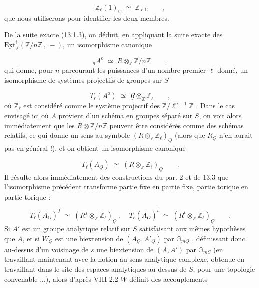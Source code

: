 \begin{equation*}
\mathbb{Z}_{\ell}(1)_{\mathbb{C}} \;\simeq\; \mathbb{Z}_{\ell\mathbb{C}} \qquad ,
\end{equation*}
que nous utiliserons pour identifier les deux membres.

De la suite exacte (13.1.3), on déduit, en appliquant la suite exacte des $\underline{\mathrm{Ext}}^{i}_{\mathbb{Z}}(\mathbb{Z}/n\mathbb{Z}\,,\ -)$, un isomorphisme canonique



\begin{equation}\tag{13.5.5}
{}_{n}A^{\mathrm{o}} \;\simeq\; \underline{R}\otimes_{\mathbb{Z}}\mathbb{Z}/n\mathbb{Z} \qquad ,
\end{equation}
qui donne, pour $n$ parcourant les puissances d'un nombre premier $\ell$ donné, un isomorphisme de systèmes projectifs de groupes sur $S$

\begin{equation}\tag{13.5.6}
T_{\ell}(A^{\mathrm{o}}) \;\simeq\; \underline{R}\otimes_{\mathbb{Z}}\mathbb{Z}_{\ell} \qquad ,
\end{equation}
où $\mathbb{Z}_{\ell}$ est considéré comme le système projectif des $\mathbb{Z}/\ell^{n+1}\mathbb{Z}$ . Dans le cas envisagé ici où $A$ provient d'un schéma en groupes séparé sur $S$, on voit alors immédiatement que les $\underline{R}\otimes\mathbb{Z}/n\mathbb{Z}$ peuvent être considérés comme des schémas relatifs, ce qui donne un sens au symbole $(\underline{R}\otimes_{\mathbb{Z}}\mathbb{Z}_{\ell})_{\underline{O}}$ (alors que $R_{\underline{O}}$ n'en aurait pas en général !), et on obtient un isomorphisme canonique

\begin{equation}\tag{13.5.7}
T_{\ell}(A_{\underline{O}}) \;\simeq\; (\underline{R}\otimes_{\mathbb{Z}}\mathbb{Z}_{\ell})_{\underline{O}} \qquad .
\end{equation}
Il résulte alors immédiatement des constructions du par. 2 et de 13.3 que l'isomorphisme précédent transforme partie fixe en partie fixe, partie torique en partie torique :

\begin{equation}\tag{13.5.8}
T_{\ell}(A_{\underline{O}})^{f} \;\simeq\; (\underline{R}^{f}\otimes_{\mathbb{Z}}\mathbb{Z}_{\ell})_{\underline{O}} \;,\quad T_{\ell}(A_{\underline{O}})^{t} \;\simeq\; (\underline{R}^{t}\otimes_{\mathbb{Z}}\mathbb{Z}_{\ell})_{\underline{O}} \qquad .
\end{equation}
Si $A'$ est un groupe analytique relatif sur $S$ satisfaisant aux mêmes hypothèses que $A$, et si $W_{\underline{O}}$ est une biextension de $(A_{\underline{O}},A'_{\underline{O}})$ par $\mathbb{G}_{m\underline{O}}$ , définissant donc au-dessus d'un voisinage de $s$ une biextension de $(A,A')$ par $\mathbb{G}_{mS}$ (en travaillant maintenant avec la notion au sens analytique complexe, obtenue en travaillant dans le site des espaces analytiques au-dessus de $S$, pour une topologie convenable ...), alors d'après VIII 2.2 $W$ définit des accouplements


